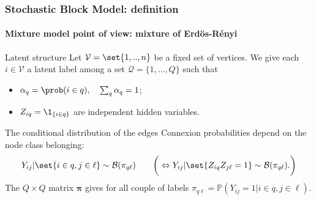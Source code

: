 \documentclass{beamer}\usepackage[]{graphicx}\usepackage[]{color}
\begin{document}
\begin{frame}
  \frametitle{Stochastic Block Model: definition}
    \framesubtitle{Mixture model point of view: mixture of Erdös-Rényi}

    \begin{block}{Latent structure}
      Let $\mathcal{V} = \set{1,..,n}$ be a fixed set of vertices. We give each $i\in\mathcal{V}$ a \alert{latent label} among a set $\mathcal{Q}=\{1,\dots,Q\}$ such that
    \begin{itemize}
    \item $\alpha_q = \prob(i\in q), \quad \sum_q \alpha_q=1$;
    \item $Z_{iq}=\1_{\{i \in  q\}}$  are independent  hidden variables.
   \end{itemize}
   \end{block}

    \begin{block}{The conditional distribution of the edges}
    Connexion probabilities depend on the node class belonging:
    \begin{equation*}
      Y_{ij} | \set{i\in q, j\in\ell} \sim \mathcal{B}(\pi_{q \ell}) \qquad \bigg(\Leftrightarrow       Y_{ij} | \set{Z_{iq}Z_{j\ell}=1} \sim \mathcal{B}(\pi_{q \ell}).
 \bigg)
    \end{equation*}
    The $Q\times Q$ matrix ${\boldsymbol\pi}$  gives for all couple of labels $\pi_{q\ell}=\mathbb{P}(Y_{ij}=1|i\in q, j\in\ell)$.
   \end{block}

\end{frame}
\end{document}
